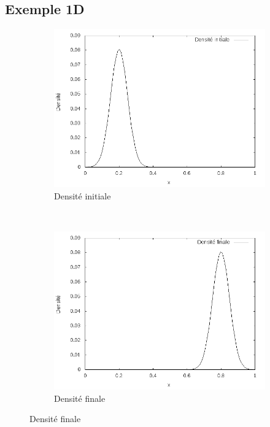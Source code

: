 \documentclass{beamer}
\begin{document}
\subsection{Exemple 1D}
\begin{frame}%
\begin{figure}[!h]
\centering 
	\begin{subfigure}[b]{0.48\linewidth}
	\includegraphics[width=\textwidth]{img/1DGaussian100x100/f0.png}
	\caption{Densité initiale}
	\end{subfigure}
	~
	\begin{subfigure}[b]{0.48\linewidth}
	\includegraphics[width=\textwidth]{img/1DGaussian100x100/f1.png}
	\caption{Densité finale}
	\end{subfigure}
	

\end{figure}
\end{frame}
\end{document}
